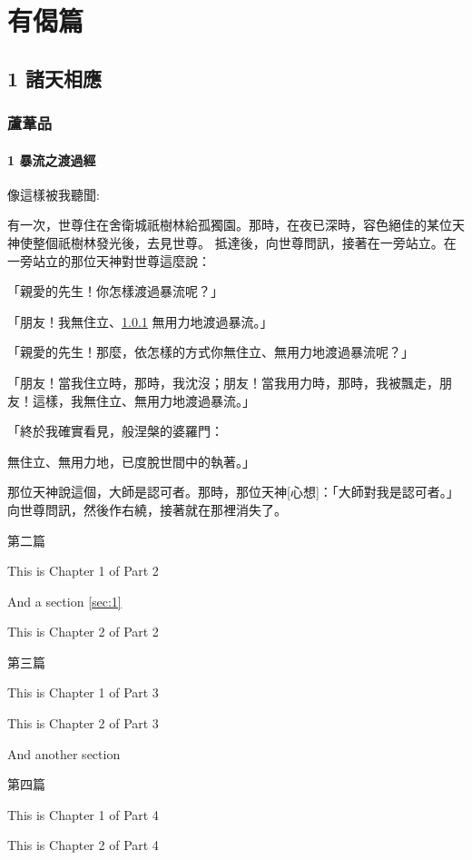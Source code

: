 \documentclass[a5paper,12pt]{book}
\begin{document}

\part*{有偈篇}

\chapter{1 諸天相應}\label{ch:1-諸天相應}


\section*{蘆葦品}\label{sec:蘆葦品}

\subsection{1 暴流之渡過經}\label{subsec:1}

像這樣被我聽聞:

有一次，世尊住在舍衛城祇樹林給孤獨園。那時，在夜已深時，容色絕佳的某位天神使整個祇樹林發光後，去見世尊。
抵達後，向世尊問訊，接著在一旁站立。在一旁站立的那位天神對世尊這麼說：

「親愛的先生！你怎樣渡過暴流呢？」

「朋友！我無住立、\ref{subsec:1} 無用力地渡過暴流。」

「親愛的先生！那麼，依怎樣的方式你無住立、無用力地渡過暴流呢？」

「朋友！當我住立時，那時，我沈沒；朋友！當我用力時，那時，我被飄走，朋友！這樣，我無住立、無用力地渡過暴流。」

「終於我確實看見，般涅槃的婆羅門：

無住立、無用力地，已度脫世間中的執著。」

那位天神說這個，大師是認可者。那時，那位天神[心想]：「大師對我是認可者。」向世尊問訊，然後作右繞，接著就在那裡消失了。

\clearpage

第二篇
This is Chapter 1 of Part 2
And a section \ref{sec:1}
\clearpage
This is Chapter 2 of Part 2
\clearpage

第三篇
This is Chapter 1 of Part 3
\clearpage
This is Chapter 2 of Part 3
And another section
\clearpage
第四篇
This is Chapter 1 of Part 4
\clearpage
This is Chapter 2 of Part 4
\clearpage
\end{document}
